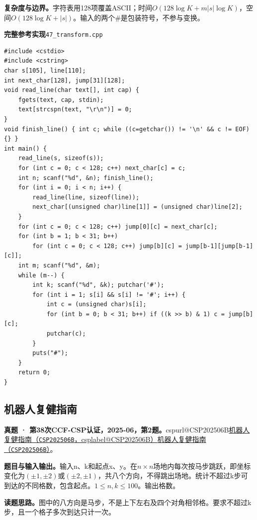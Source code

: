 \documentclass[UTF8,11pt,a4paper,fontset=none]{ctexart}
\makeatletter
\newcommand{\csp}[2]{\ifcsname cspurl@#1\endcsname\href{\csname cspurl@#1\endcsname}{#2（\texttt{#1}，\csname csplabel@#1\endcsname）}\else\href{https://oj.shumeng.tech/p/#1}{#2（\texttt{#1}）}\fi}
\makeatother
\begin{document}
\noindent\textbf{复杂度与边界。}字符表用128项覆盖ASCII；时间$O(128\log K+m|s|\log K)$，空间$O(128\log K+|s|)$。输入的两个\#是包装符号，不参与变换。
\par\noindent\begin{minipage}{\linewidth}
\textbf{完整参考实现}\quad\texttt{47\_transform.cpp}
\begin{lstlisting}
#include <cstdio>
#include <cstring>
char s[105], line[110];
int next_char[128], jump[31][128];
void read_line(char text[], int cap) {
    fgets(text, cap, stdin);
    text[strcspn(text, "\r\n")] = 0;
}
void finish_line() { int c; while ((c=getchar()) != '\n' && c != EOF) {} }
int main() {
    read_line(s, sizeof(s));
    for (int c = 0; c < 128; c++) next_char[c] = c;
    int n; scanf("%d", &n); finish_line();
    for (int i = 0; i < n; i++) {
        read_line(line, sizeof(line));
        next_char[(unsigned char)line[1]] = (unsigned char)line[2];
    }
    for (int c = 0; c < 128; c++) jump[0][c] = next_char[c];
    for (int b = 1; b < 31; b++)
        for (int c = 0; c < 128; c++) jump[b][c] = jump[b-1][jump[b-1][c]];
    int m; scanf("%d", &m);
    while (m--) {
        int k; scanf("%d", &k); putchar('#');
        for (int i = 1; s[i] && s[i] != '#'; i++) {
            int c = (unsigned char)s[i];
            for (int b = 0; b < 31; b++) if ((k >> b) & 1) c = jump[b][c];
            putchar(c);
        }
        puts("#");
    }
    return 0;
}
\end{lstlisting}
\end{minipage}\par


\subsection{机器人复健指南}
\textbf{真题 · 第38次CCF-CSP认证，2025-06，第2题。}\csp{CSP202506B}{机器人复健指南}。

\noindent\textbf{题目与输入输出。}输入n、k和起点x、y。在$n\times n$场地内每次按马步跳跃，即坐标变化为$(\pm1,\pm2)$或$(\pm2,\pm1)$，共八个方向，不得跳出场地。统计不超过k步可到达的不同格数，包含起点。$1\le n,k\le100$。输出格数。

\noindent\textbf{读题思路。}图中的八方向是马步，不是上下左右及四个对角相邻格。要求不超过k步，且一个格子多次到达只计一次。
\end{document}
